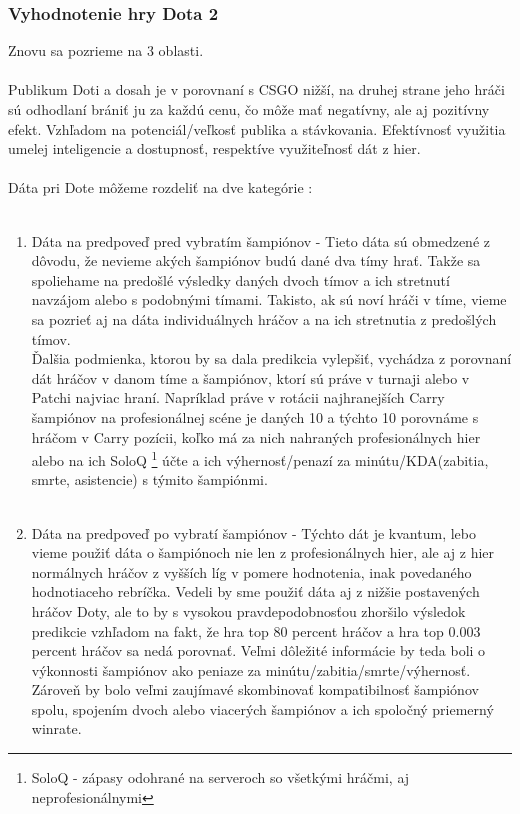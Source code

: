 \subsubsection{Vyhodnotenie hry Dota 2}
Znovu sa pozrieme na 3 oblasti. \\ \\ 
Publikum Doti a dosah je v porovnaní s CSGO nižší, na druhej strane jeho hráči sú odhodlaní brániť ju za každú cenu, čo môže mať negatívny, ale aj pozitívny efekt. Vzhľadom na  potenciál/veľkosť publika a stávkovania. Efektívnosť využitia umelej inteligencie a dostupnosť, respektíve využiteľnosť dát z hier.
\\ \\
Dáta pri Dote môžeme rozdeliť na dve kategórie : 
\\ \\
\begin{enumerate}
\item Dáta na predpoveď pred vybratím šampiónov - Tieto dáta sú obmedzené z dôvodu, že nevieme akých šampiónov budú dané dva tímy hrať. Takže sa spoliehame na predošlé výsledky daných dvoch tímov a ich stretnutí navzájom alebo s podobnými tímami. Takisto, ak sú noví hráči v tíme, vieme sa pozrieť aj na dáta individuálnych hráčov a na ich stretnutia z predošlých tímov. \\
Ďalšia podmienka, ktorou by sa dala predikcia vylepšiť, vychádza z porovnaní dát hráčov v danom tíme a šampiónov, ktorí sú práve v turnaji alebo v Patchi najviac hraní. Napríklad práve v rotácii najhranejších Carry šampiónov na profesionálnej scéne je daných 10 a týchto 10 porovnáme s hráčom v Carry pozícii, koľko má za nich nahraných profesionálnych hier alebo na ich SoloQ \footnote {
	SoloQ - zápasy odohrané na serveroch so všetkými hráčmi, aj neprofesionálnymi
} účte a ich výhernosť/penazí za minútu/KDA(zabitia, smrte, asistencie) s týmito šampiónmi.  
\\ \\
\item Dáta na predpoveď po vybratí šampiónov - Týchto dát je kvantum, lebo vieme použiť dáta o šampiónoch nie len z profesionálnych hier, ale aj z hier normálnych hráčov z vyšších líg v pomere hodnotenia, inak povedaného hodnotiaceho rebríčka. Vedeli by sme použiť dáta aj z nižšie postavených hráčov Doty, ale to by s vysokou pravdepodobnosťou zhoršilo výsledok predikcie vzhľadom na fakt, že hra top 80 percent hráčov a hra top 0.003 percent hráčov sa nedá porovnať. Veľmi dôležité informácie by teda boli o výkonnosti šampiónov ako peniaze za minútu/zabitia/smrte/výhernosť. Zároveň by bolo veľmi zaujímavé skombinovať kompatibilnosť šampiónov spolu, spojením dvoch alebo viacerých šampiónov a ich spoločný priemerný winrate.
\end{enumerate}

